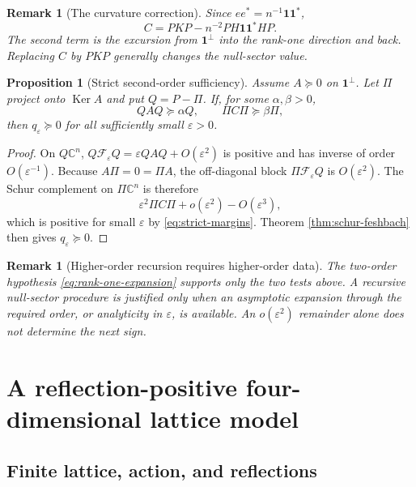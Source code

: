 \documentclass[11pt]{article}
\newtheorem{proposition}[theorem]{Proposition}
\newtheorem{remark}[theorem]{Remark}
\newcommand{\one}{\mathbf 1}
\newcommand{\C}{\mathbb C}
\newcommand{\eps}{\varepsilon}
\newcommand{\Ker}{\operatorname{Ker}}
\begin{document}
\begin{remark}[The curvature correction]
Since $ee^*=n^{-1}\one\one^*$,
\begin{equation}
  C=PKP-n^{-2}PH\one\one^*HP.
  \label{eq:C-one}
\end{equation}
The second term is the excursion from $\one^\perp$ into the rank-one direction and back.  Replacing $C$ by $PKP$ generally changes the null-sector value.
\end{remark}

\begin{proposition}[Strict second-order sufficiency]
\label{prop:strict-sufficiency}
Assume $A\succeq0$ on $\one^\perp$.  Let $\Pi$ project onto $\Ker A$ and put $Q=P-\Pi$.  If, for some $\alpha,\beta>0$,
\begin{equation}
  QAQ\succeq\alpha Q,
  \qquad
  \Pi C\Pi\succeq\beta\Pi,
  \label{eq:strict-margins}
\end{equation}
then $q_\eps\succeq0$ for all sufficiently small $\eps>0$.
\end{proposition}

\begin{proof}
On $Q\C^n$, $Q\mathcal F_\eps Q=\eps QAQ+O(\eps^2)$ is positive and has inverse of order $O(\eps^{-1})$.  Because $A\Pi=0=\Pi A$, the off-diagonal block $\Pi\mathcal F_\eps Q$ is $O(\eps^2)$.  The Schur complement on $\Pi\C^n$ is therefore
\[
  \eps^2\Pi C\Pi+o(\eps^2)-O(\eps^3),
\]
which is positive for small $\eps$ by \eqref{eq:strict-margins}.  Theorem \ref{thm:schur-feshbach} then gives $q_\eps\succeq0$.
\end{proof}

\begin{remark}[Higher-order recursion requires higher-order data]
The two-order hypothesis \eqref{eq:rank-one-expansion} supports only the two tests above.  A recursive null-sector procedure is justified only when an asymptotic expansion through the required order, or analyticity in $\eps$, is available.  An $o(\eps^2)$ remainder alone does not determine the next sign.
\end{remark}

\section{A reflection-positive four-dimensional lattice model}
\label{sec:lattice-model}

\subsection{Finite lattice, action, and reflections}
\end{document}
